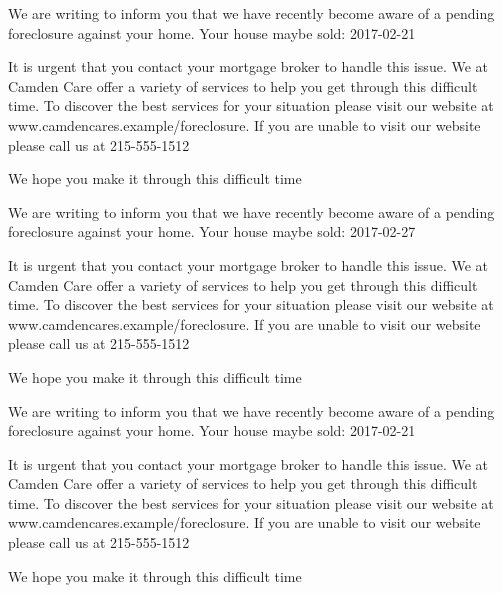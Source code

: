 \documentclass[10pt,stdletter]{newlfm}
\begin{document}
\pagebreak
{}
\begin{newlfm}

We are writing to inform you that we have recently become aware of a pending foreclosure against your home. Your house maybe sold: 2017-02-21

It is urgent that you contact your mortgage broker to handle this issue.
We at Camden Care offer a variety of services to help you get through this difficult time. To discover the best services for your situation please visit our website at www.camdencares.example/foreclosure.
If you are unable to visit our website please call us at 215-555-1512

We hope you make it through this difficult time

\end{newlfm}
\pagebreak
{}
\begin{newlfm}

We are writing to inform you that we have recently become aware of a pending foreclosure against your home. Your house maybe sold: 2017-02-27

It is urgent that you contact your mortgage broker to handle this issue.
We at Camden Care offer a variety of services to help you get through this difficult time. To discover the best services for your situation please visit our website at www.camdencares.example/foreclosure.
If you are unable to visit our website please call us at 215-555-1512

We hope you make it through this difficult time

\end{newlfm}
\pagebreak
{}
\begin{newlfm}

We are writing to inform you that we have recently become aware of a pending foreclosure against your home. Your house maybe sold: 2017-02-21

It is urgent that you contact your mortgage broker to handle this issue.
We at Camden Care offer a variety of services to help you get through this difficult time. To discover the best services for your situation please visit our website at www.camdencares.example/foreclosure.
If you are unable to visit our website please call us at 215-555-1512

We hope you make it through this difficult time

\end{newlfm}
\end{document}
